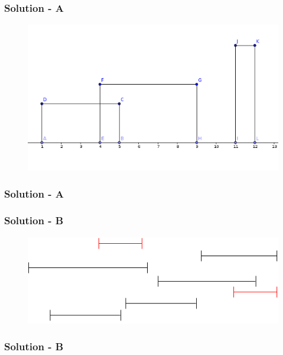 \documentclass{beamer}
\begin{document}
\begin{frame}
    \frametitle{Solution - A}
    \begin{figure}[h]
        \includegraphics[scale=0.5]{sweep_line}
    \end{figure}
\end{frame}
\begin{frame}
    \frametitle{Solution - A}
\end{frame}
\begin{frame}
    \frametitle{Solution - B}
    \begin{figure}[h]
        \includegraphics[scale=0.7]{interval_schedule}
    \end{figure}
\end{frame}
\begin{frame}
    \frametitle{Solution - B}
\end{frame}
\end{document}
